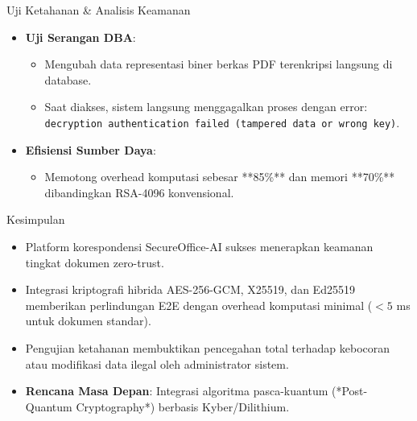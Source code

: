 \documentclass{beamer}
\begin{document}
\begin{frame}{Uji Ketahanan \& Analisis Keamanan}
  \begin{itemize}
    \item \textbf{Uji Serangan DBA}:
      \begin{itemize}
        \item Mengubah data representasi biner berkas PDF terenkripsi langsung di database.
        \item Saat diakses, sistem langsung menggagalkan proses dengan error:
          \texttt{decryption authentication failed (tampered data or wrong key)}.
      \end{itemize}
    \vspace{0.3cm}
    \item \textbf{Efisiensi Sumber Daya}:
      \begin{itemize}
        \item Memotong overhead komputasi sebesar **85\%** dan memori **70\%** dibandingkan RSA-4096 konvensional.
      \end{itemize}
  \end{itemize}
\end{frame}

\begin{frame}{Kesimpulan}
  \begin{itemize}
    \item Platform korespondensi SecureOffice-AI sukses menerapkan keamanan tingkat dokumen zero-trust.
    \item Integrasi kriptografi hibrida AES-256-GCM, X25519, dan Ed25519 memberikan perlindungan E2E dengan overhead komputasi minimal ($<5$ ms untuk dokumen standar).
    \item Pengujian ketahanan membuktikan pencegahan total terhadap kebocoran atau modifikasi data ilegal oleh administrator sistem.
    \item \textbf{Rencana Masa Depan}: Integrasi algoritma pasca-kuantum (*Post-Quantum Cryptography*) berbasis Kyber/Dilithium.
  \end{itemize}
\end{frame}
\end{document}
